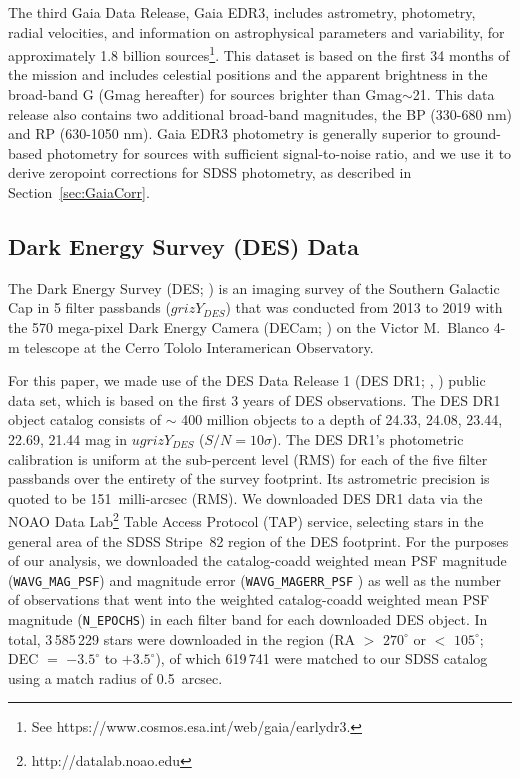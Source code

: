 \documentclass[fleqn,usenatbib]{mnras}
\begin{document}
The third Gaia Data Release, Gaia EDR3, includes astrometry, photometry, radial velocities, and information on astrophysical parameters and variability, for approximately 1.8 billion sources\footnote{See https://www.cosmos.esa.int/web/gaia/earlydr3.}. This dataset is based on the first 34 months of the mission and includes celestial positions and the apparent brightness in the broad-band G (Gmag hereafter) for sources brighter than Gmag$\sim$21.  This data release also contains two additional broad-band magnitudes, the BP (330-680 nm) and RP (630-1050 nm). Gaia EDR3 photometry is generally superior to ground-based photometry for sources with sufficient signal-to-noise ratio, and we use it to derive zeropoint corrections for SDSS photometry, as described in Section~\ref{sec:GaiaCorr}. 
 

\subsection{Dark Energy Survey (DES) Data} \label{ssec:des}


The Dark Energy Survey (DES; \citealt{2016MNRAS.460.1270D}) is an imaging survey of the Southern Galactic Cap in 5 filter passbands ($grizY_{DES}$) that was conducted from 2013 to 2019 with the 570 mega-pixel Dark Energy Camera (DECam;
\citealt{2008arXiv0810.3600H,2015AJ....150..150F}) on the Victor M.\ Blanco 4-m telescope at the Cerro Tololo Interamerican
Observatory.

For this paper, we made use of the DES Data Release 1 (DES DR1; \citealt{Morg2018}, \citealt{2018ApJS..239...18A}) public data set, which is based on the first 3 years of DES observations.  The DES DR1 object catalog consists of $\sim$ 400 million objects to a depth of 24.33, 24.08, 23.44, 22.69, 21.44 mag in $ugrizY_{DES}$ ($S/N=10\sigma$).  The DES DR1's photometric calibration is uniform at the sub-percent level (RMS) for each of the five filter passbands over the entirety of the survey footprint.  Its astrometric precision is quoted to be 151~milli-arcsec (RMS).  We downloaded DES DR1 data via the NOAO
Data Lab\footnote{http://datalab.noao.edu} Table Access Protocol (TAP) service, selecting stars in the general area of the SDSS Stripe~82 region of the DES footprint.  For the purposes of our analysis, we downloaded the catalog-coadd weighted mean PSF magnitude ({\tt WAVG\_MAG\_PSF}) and magnitude error ({\tt WAVG\_MAGERR\_PSF} ) as well as the number of observations that went into the weighted catalog-coadd weighted mean PSF magnitude ({\tt N\_EPOCHS}) in each filter band for each downloaded DES object.  In total, 3\,585\,229 stars were downloaded in the region (RA $>$ $270^{\circ}$ or $<$  $105^{\circ}$; DEC $=$ $-3.5^{\circ}$ to $+3.5^{\circ}$), of which 619\,741 were matched to our SDSS catalog using a match radius of 0.5~arcsec.
\end{document}
